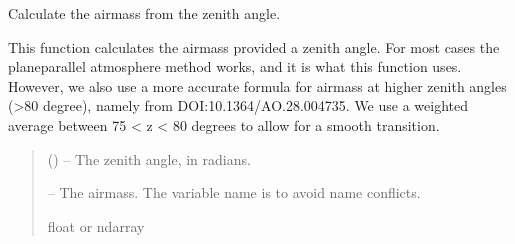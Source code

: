 \documentclass[letterpaper,11pt,english]{sphinxmanual}
\begin{document}
\begin{savenotes}\begin{fulllineitems}
\label{\detokenize{code/lezargus.library.atmosphere:lezargus.library.atmosphere.airmass}}
\pysigstartsignatures
{}
\pysigstopsignatures
\sphinxAtStartPar
Calculate the airmass from the zenith angle.

\sphinxAtStartPar
This function calculates the airmass provided a zenith angle. For most
cases the plane\sphinxhyphen{}parallel atmosphere method works, and it is what this
function uses. However, we also use a more accurate formula for airmass at
higher zenith angles (>80 degree), namely from DOI:10.1364/AO.28.004735.
We use a weighted average between 75 < z < 80 degrees to allow for a
smooth transition.
\begin{quote}\begin{description}
\sphinxAtStartPar
{} () – The zenith angle, in radians.

\sphinxAtStartPar
{} – The airmass. The variable name is to avoid name conflicts.

\sphinxAtStartPar
float or ndarray

\end{description}\end{quote}

\end{fulllineitems}\end{savenotes}
\end{document}
